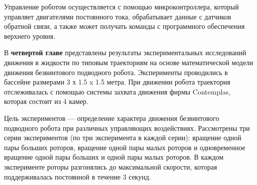 



%


Управление роботом осуществляется с помощью микроконтроллера, который управляет двигателями постоянного тока, обрабатывает данные с датчиков обратной связи, а также может получать команды с программного обеспечения верхнего уровня.














В {\textbf{четвертой главе}} представлены результаты экспериментальных исследований движения в жидкости по типовым траекториям на основе математической модели движения безвинтового подводного робота. Эксперименты проводились в бассейне размерами 3 х 1.5 x 1.5 метра. При движении робота траектория отслеживалась с помощью системы захвата движения фирмы Contemplas, которая состоит из 4 камер.%

Цель экспериментов --- определение характера движения безвинтового подводного робота при различных управляющих воздействиях. 
Рассмотрены три серии экспериментов (по три эксперимента в каждой серии): вращение одной пары больших роторов, вращение одной пары малых роторов и одновременное вращение одной пары больших и одной пары малых роторов. В каждом эксперименте роторы разгонялись до максимальной скорости, которая поддерживалась постоянной в течение 3 секунд.

